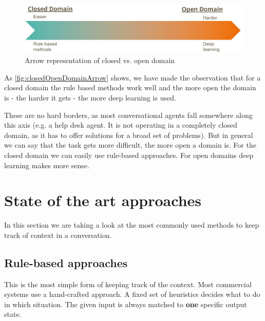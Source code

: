 \documentclass[conference]{IEEEtran}
\begin{document}
\begin{figure}[H]
\centering
   \includegraphics[width=\linewidth]{closedOpenDomainArrow.jpg}
  \caption{Arrow representation of closed vs. open domain}
  \label{fig:closedOpenDomainArrow}
\end{figure}

As \autoref{fig:closedOpenDomainArrow} shows, we have made the observation that for a closed domain the rule based methods work well and the more open the domain is - the harder it gets - the more deep learning is used.

These are no hard borders, as most conversational agents fall somewhere along this axis (e.g. a help desk agent. It is not operating in a completely closed domain, as it has to offer solutions for a broad set of problems). But in general we can say that the task gets more difficult, the more open a domain is. For the closed domain we can easily use rule-based approaches. For open domains deep learning makes more sense. 




\section{State of the art approaches}
In this section we are taking a look at the most commonly used methods to keep track of context in a conversation.
\subsection{Rule-based approaches}
This is the most simple form of keeping track of the context. Most commercial systems use a hand-crafted approach\cite{williams2013dialog}. A fixed set of heuristics decides what to do in which situation. 
The given input is always matched to \textbf{one} specific output state. 
\end{document}
